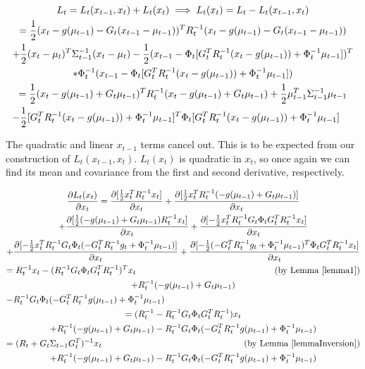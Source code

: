 \begin{multline}
L_t = L_t(x_{t-1},x_t) + L_t(x_t)  \implies L_t(x_t) = L_t -  L_t(x_{t-1},x_t) \\
= \frac{1}{2} (x_t - g(\mu_{t-1}) - G_t (x_{t-1} - \mu_{t-1}))^T R_t^{-1} (x_t - g(\mu_{t-1}) - G_t (x_{t-1} - \mu_{t-1}))\\
+ \frac{1}{2} (x_t - \mu_t)^T \Sigma_{t-1}^{-1} (x_t - \mu_t) - \frac{1}{2} (x_{t-1} - \Phi_t [G_t^T R_t^{-1}  (x_t - g(\mu_{t-1})) + \Phi_t^{-1} \mu_{t-1}])^T \\
* \Phi_t^{-1} (x_{t-1} - \Phi_t [G_t^T R_t^{-1}  (x_t - g(\mu_{t-1})) + \Phi_t^{-1} \mu_{t-1}]) \\
= \frac{1}{2} (x_t - g(\mu_{t-1}) + G_t \mu_{t-1})^T R_t^{-1} (x_t - g(\mu_{t-1}) + G_t \mu_{t-1}) + \frac{1}{2} \mu_{t-1}^T \Sigma_{t-1}^{-1} \mu_{t-1} \\
- \frac{1}{2} [G_t^T R_t^{-1}  (x_t - g(\mu_{t-1})) + \Phi_t^{-1} \mu_{t-1}]^T \Phi_t [G_t^T R_t^{-1}  (x_t - g(\mu_{t-1})) + \Phi_t^{-1} \mu_{t-1}] \hfill
\end{multline}

The quadratic and linear \(x_{t-1}\) terms cancel out. This is to be expected from our construction of \(L_t(x_{t-1}, x_t)\). \(L_t(x_t)\) is quadratic in \(x_t\), so once again we can find its mean and covariance from the first and second derivative, respectively.


\begin{multline}
\frac{\partial L_t(x_t)}{\partial x_t} = \frac{\partial [\frac{1}{2} x_t^T R_t^{-1}x_t]}{\partial x_t} + \frac{\partial [\frac{1}{2} x_t^TR_t^{-1}(-g(\mu_{t-1})+G_t\mu_{t-1})]}{\partial x_t} \\
+ \frac{\partial [\frac{1}{2} (-g(\mu_{t-1})+G_t\mu_{t-1})R_t^{-1}x_t]}{\partial x_t} + \frac{\partial [-\frac{1}{2} x_t^TR_t^{-1}G_t\Phi_tG_t^TR_t^{-1}x_t]}{\partial x_t} \\
+ \frac{\partial [-\frac{1}{2} x_t^TR_t^{-1}G_t\Phi_t(-G_t^TR_t^{-1}g_t + \Phi_t^{-1}\mu_{t-1})]}{\partial x_t} + \frac{\partial [-\frac{1}{2} (-G_t^TR_t^{-1}g_t + \Phi_t^{-1}\mu_{t-1})^T\Phi_tG_t^TR_t^{-1}x_t]}{\partial x_t} \\
= R_t^{-1}x_t - (R_t^{-1}G_t\Phi_tG_t^TR_t^{-1})^Tx_t  \hfill \text{(by Lemma \ref{lemma1})} \\
+ R_t^{-1}(-g(\mu_{t-1}) + G_t\mu_{t-1}) \\
- R_t^{-1}G_t\Phi_t(-G_t^TR_t^{-1}g(\mu_{t-1}) + \Phi_t^{-1}\mu_{t-1}) \hfill \\
= (R_t^{-1} - R_t^{-1}G_t\Phi_tG_t^TR_t^{-1})x_t \\
+ R_t^{-1}(-g(\mu_{t-1}) + G_t\mu_{t-1}) - R_t^{-1}G_t\Phi_t(-G_t^TR_t^{-1}g(\mu_{t-1}) + \Phi_t^{-1}\mu_{t-1}) \\
= (R_t + G_t\Sigma_{t-1}G_t^T)^{-1}x_t \hfill \text{(by Lemma \ref{lemmaInversion})} \\
+ R_t^{-1}(-g(\mu_{t-1}) + G_t\mu_{t-1}) - R_t^{-1}G_t\Phi_t(-G_t^TR_t^{-1}g(\mu_{t-1}) + \Phi_t^{-1}\mu_{t-1}) 
\end{multline}

